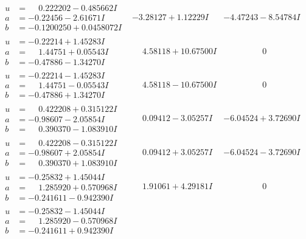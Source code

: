 \documentclass[1p]{elsarticle_modified}
\theoremstyle{definition}
\begin{document}
$$\begin{array}{c|c|c}
\begin{aligned}
u &= \phantom{-}0.222202 - 0.485662 I \\
a &= -0.22456 - 2.61671 I \\
b &= -0.1200250 + 0.0458072 I\end{aligned}
 & -3.28127 + 1.12229 I & -4.47243 - 8.54784 I \\ \hline\begin{aligned}
u &= -0.22214 + 1.45283 I \\
a &= \phantom{-}1.44751 + 0.05543 I \\
b &= -0.47886 - 1.34270 I\end{aligned}
 & \phantom{-}4.58118 + 10.67500 I & \phantom{-0.000000 } 0 \\ \hline\begin{aligned}
u &= -0.22214 - 1.45283 I \\
a &= \phantom{-}1.44751 - 0.05543 I \\
b &= -0.47886 + 1.34270 I\end{aligned}
 & \phantom{-}4.58118 - 10.67500 I & \phantom{-0.000000 } 0 \\ \hline\begin{aligned}
u &= \phantom{-}0.422208 + 0.315122 I \\
a &= -0.98607 - 2.05854 I \\
b &= \phantom{-}0.390370 - 1.083910 I\end{aligned}
 & \phantom{-}0.09412 - 3.05257 I & -6.04524 + 3.72690 I \\ \hline\begin{aligned}
u &= \phantom{-}0.422208 - 0.315122 I \\
a &= -0.98607 + 2.05854 I \\
b &= \phantom{-}0.390370 + 1.083910 I\end{aligned}
 & \phantom{-}0.09412 + 3.05257 I & -6.04524 - 3.72690 I \\ \hline\begin{aligned}
u &= -0.25832 + 1.45044 I \\
a &= \phantom{-}1.285920 + 0.570968 I \\
b &= -0.241611 - 0.942390 I\end{aligned}
 & \phantom{-}1.91061 + 4.29181 I & \phantom{-0.000000 } 0 \\ \hline\begin{aligned}
u &= -0.25832 - 1.45044 I \\
a &= \phantom{-}1.285920 - 0.570968 I \\
b &= -0.241611 + 0.942390 I\end{aligned}

\end{array}$$
\end{document}
